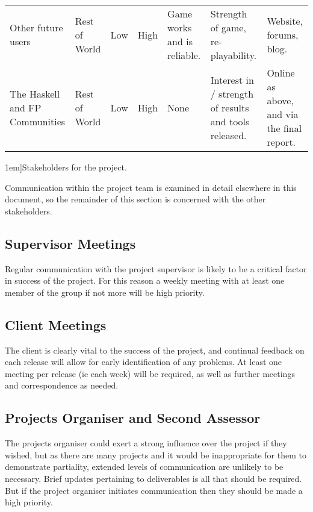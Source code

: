 \begin{table*}
\begin{tabular}{p{9em} p{5em} p{3em} p{3em} p{9em} p{9em} p{9em}}
		Other future users & Rest of World & Low & High & 
		Game works and is reliable. & 
		Strength of game, re-playability. & 
		Website, forums, blog. \\
		
		The Haskell and FP Communities & Rest of World & Low & High & 
		None & 
		Interest in  / strength of results and tools released. & 
		Online as above, and via the final report. \\
		\bottomrule
	\end{tabular}
	\vspace{1.5em}
	\caption[][1em]{Stakeholders for the project.}
	\label{tab:stakeholders}
\end{table*}

\noindent Communication within the project team is examined in detail elsewhere in this document, so the remainder of this section is concerned with the other stakeholders.

\subsection{Supervisor Meetings}

Regular communication with the project supervisor is likely to be a critical factor in success of the project. For this reason a weekly meeting with at least one member of the group if not more will be high priority.

\subsection{Client Meetings}

The client is clearly vital to the success of the project, and continual feedback on each release will allow for early identification of any problems. At least one meeting per release (ie each week) will be required, as well as further meetings and correspondence as needed.

\subsection{Projects Organiser and Second Assessor}

The projects organiser could exert a strong influence over the project if they wished, but as there are many projects and it would be inappropriate for them to demonstrate partiality, extended levels of communication are unlikely to be necessary. Brief updates pertaining to deliverables is all that should be required. But if the project organiser initiates communication then they should be made a high priority.

